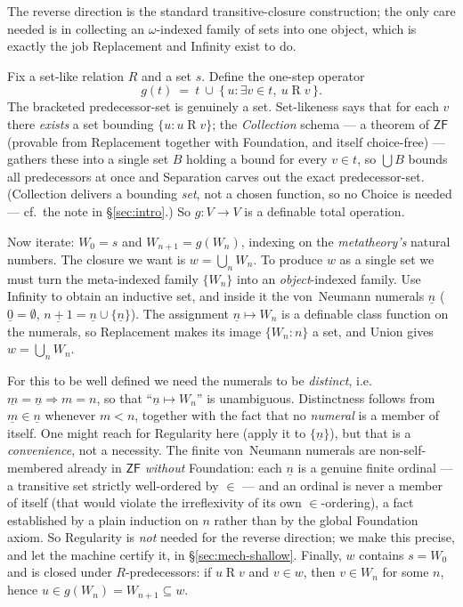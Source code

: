 \documentclass[11pt]{article}
\theoremstyle{plain}
\theoremstyle{definition}
\newcommand{\ZF}{\mathsf{ZF}}
\renewcommand{\ZF}{\textsf{ZF}}
\begin{document}
The reverse direction is the standard transitive-closure construction; the only
care needed is in collecting an $\omega$-indexed family of sets into one object,
which is exactly the job Replacement and Infinity exist to do.

Fix a set-like relation $R$ and a set $s$. Define the one-step operator
\[
  g(t) \ =\ t \ \cup\ \{\,u : \exists v \in t,\ u \mathrel{R} v\,\}.
\]
The bracketed predecessor-set is genuinely a set. Set-likeness says that for each
$v$ there \emph{exists} a set bounding $\{u : u \mathrel R v\}$; the \emph{Collection}
schema --- a theorem of $\ZF$ (provable from Replacement together with Foundation,
and itself choice-free) --- gathers these into a single set $B$ holding a bound for
every $v \in t$, so $\bigcup B$ bounds all predecessors at once and Separation carves
out the exact predecessor-set. (Collection delivers a bounding \emph{set}, not a
chosen function, so no Choice is needed --- cf.\ the note in \S\ref{sec:intro}.) So
$g : V \to V$ is a definable total operation.

Now iterate: $W_0 = s$ and $W_{n+1} = g(W_n)$, indexing on the \emph{metatheory's}
natural numbers. The closure we want is $w = \bigcup_n W_n$. To produce $w$ as a
single set we must turn the meta-indexed family $\{W_n\}$ into an
\emph{object}-indexed family. Use Infinity to obtain an inductive set, and inside it
the von~Neumann numerals $\underline n$ ($\underline 0 = \emptyset$,
$\underline{n+1} = \underline n \cup \{\underline n\}$). The assignment
$\underline n \mapsto W_n$ is a definable class function on the numerals, so
Replacement makes its image $\{W_n : n\}$ a set, and Union gives
$w = \bigcup_n W_n$.

For this to be well defined we need the numerals to be \emph{distinct}, i.e.\
$\underline m = \underline n \Rightarrow m = n$, so that ``$\underline n \mapsto
W_n$'' is unambiguous. Distinctness follows from $\underline m \in \underline n$
whenever $m < n$, together with the fact that no \emph{numeral} is a member of
itself. One might reach for Regularity here (apply it to $\{\underline n\}$), but
that is a \emph{convenience}, not a necessity. The finite von~Neumann numerals are
non-self-membered already in $\ZF$ \emph{without} Foundation: each $\underline n$ is
a genuine finite ordinal --- a transitive set strictly well-ordered by $\in$ --- and
an ordinal is never a member of itself (that would violate the irreflexivity of its
own $\in$-ordering), a fact established by a plain induction on $n$ rather than by
the global Foundation axiom. So Regularity is \emph{not} needed for the reverse
direction; we make this precise, and let the machine certify it, in
\S\ref{sec:mech-shallow}. Finally, $w$ contains $s = W_0$ and is closed under
$R$-predecessors: if $u \mathrel R v$ and $v \in w$, then $v \in W_n$ for some
$n$, hence $u \in g(W_n) = W_{n+1} \subseteq w$.
\end{document}
